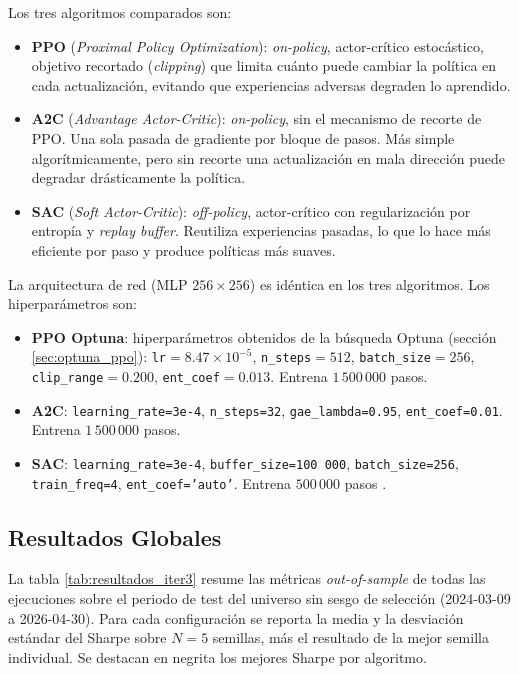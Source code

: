 \documentclass[IB,a4paper]{TFUOC}
\begin{document}
Los tres algoritmos comparados son:

\begin{itemize}
    \item \textbf{PPO} (\textit{Proximal Policy Optimization}): \textit{on-policy}, actor-crítico estocástico, objetivo recortado (\textit{clipping}) que limita cuánto puede cambiar la política en cada actualización, evitando que experiencias adversas degraden lo aprendido.
    \item \textbf{A2C} (\textit{Advantage Actor-Critic}): \textit{on-policy}, sin el mecanismo de recorte de PPO. Una sola pasada de gradiente por bloque de pasos. Más simple algorítmicamente, pero sin recorte una actualización en mala dirección puede degradar drásticamente la política.
    \item \textbf{SAC} (\textit{Soft Actor-Critic}): \textit{off-policy}, actor-crítico con regularización por entropía y \textit{replay buffer}. Reutiliza experiencias pasadas, lo que lo hace más eficiente por paso y produce políticas más suaves.
\end{itemize}

La arquitectura de red (MLP $256 \times 256$) es idéntica en los tres algoritmos. Los hiperparámetros son:

\begin{itemize}
    \item \textbf{PPO Optuna}: hiperparámetros obtenidos de la búsqueda Optuna (sección \ref{sec:optuna_ppo}): \texttt{lr}$=8.47\!\times\!10^{-5}$, \texttt{n\_steps}$=512$, \texttt{batch\_size}$=256$, \texttt{clip\_range}$=0.200$, \texttt{ent\_coef}$=0.013$. Entrena $1\,500\,000$ pasos.
    \item \textbf{A2C}: \texttt{learning\_rate=3e-4}, \texttt{n\_steps=32}, \texttt{gae\_lambda=0.95}, \texttt{ent\_coef=0.01}. Entrena $1\,500\,000$ pasos.
    \item \textbf{SAC}: \texttt{learning\_rate=3e-4}, \texttt{buffer\_size=100\,000}, \texttt{batch\_size=256}, \texttt{train\_freq=4}, \texttt{ent\_coef='auto'}. Entrena $500\,000$ pasos \citep{haarnoja2018sac}.
\end{itemize}

\subsection{Resultados Globales}

La tabla \ref{tab:resultados_iter3} resume las métricas \textit{out-of-sample} de todas las ejecuciones sobre el periodo de test del universo sin sesgo de selección (2024-03-09 a 2026-04-30). Para cada configuración se reporta la media y la desviación estándar del Sharpe sobre $N=5$ semillas, más el resultado de la mejor semilla individual. Se destacan en negrita los mejores Sharpe por algoritmo.
\end{document}
